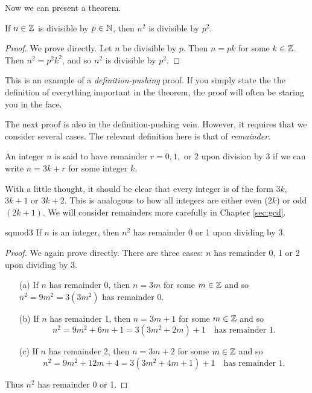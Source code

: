  Now we can present a theorem.

\begin{thm}{}{}
If $n\in\mathbb{Z}$ is divisible by $p\in\mathbb{N}$, then $n^2$ is divisible by $p^2$.
\end{thm}

\begin{proof}
We prove directly. Let $n$ be divisible by $p$. Then $n=pk$ for some $k\in\mathbb{Z}$. Then $n^2=p^2k^2$, and so $n^2$ is divisible by $p^2$.
\end{proof}

 This is an example of a \emph{definition-pushing} proof. If you simply state the the definition of everything important in the theorem, the proof will often be staring you in the face.


The next proof is also in the definition-pushing vein. However, it requires that we consider several cases. The relevant definition here is that of \emph{remainder.}

\begin{defn}{}{}
An integer $n$ is said to have remainder $r=0,1,$ or 2 upon division by 3 if we can write $n=3k+r$ for some integer $k$.
\end{defn}

 With a little thought, it should be clear that every integer is of the form $3k$, $3k+1$ or $3k+2$. This is analogous to how all integers are either even ($2k$) or odd $(2k+1)$. We will consider remainders more carefully in Chapter \ref{sec:gcd}.

\begin{thm}{}{sqmod3}
If $n$ is an integer, then $n^2$ has remainder 0 or 1 upon dividing by 3.
\end{thm}

\begin{proof}
We again prove directly. There are three cases: $n$ has remainder 0, 1 or 2 upon dividing by 3.
\begin{enumerate}
  \item[(a)] If $n$ has remainder 0, then $n=3m$ for some $m\in\mathbb{Z}$ and so $n^2=9m^2=3(3m^2)$ has remainder 0.
  \item[(b)] If $n$ has remainder 1, then $n=3m+1$ for some $m\in\mathbb{Z}$ and so
  \[n^2=9m^2+6m+1=3(3m^2+2m)+1\quad\text{has remainder 1.}\]
  \item[(c)] If $n$ has remainder 2, then $n=3m+2$ for some $m\in\mathbb{Z}$ and so
  \[n^2=9m^2+12m+4=3(3m^2+4m+1)+1\quad\text{has remainder 1.}\]
\end{enumerate}
Thus $n^2$ has remainder 0 or 1.
\end{proof}

